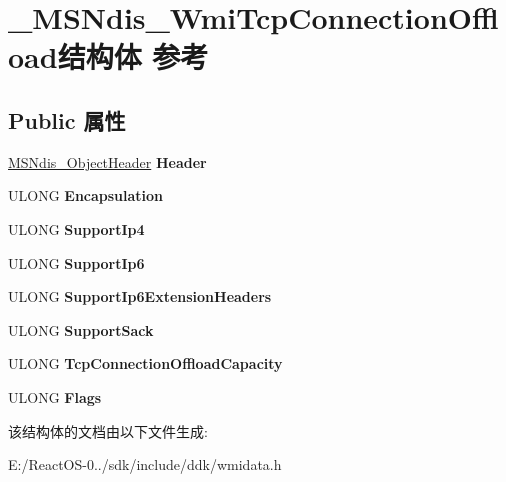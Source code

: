 \hypertarget{struct___m_s_ndis___wmi_tcp_connection_offload}{}\section{\+\_\+\+M\+S\+Ndis\+\_\+\+Wmi\+Tcp\+Connection\+Offload结构体 参考}
\label{struct___m_s_ndis___wmi_tcp_connection_offload}
\subsection*{Public 属性}
\begin{DoxyCompactItemize}
\item 
\mbox{\label{struct___m_s_ndis___wmi_tcp_connection_offload_a07eb0950675d631cdc23549e8d113b31}} 
\hyperlink{struct___m_s_ndis___object_header}{M\+S\+Ndis\+\_\+\+Object\+Header} {\bfseries Header}
\item 
\mbox{\label{struct___m_s_ndis___wmi_tcp_connection_offload_ad7d6854704d4605de5c6c78c5d14a54f}} 
U\+L\+O\+NG {\bfseries Encapsulation}
\item 
\mbox{\label{struct___m_s_ndis___wmi_tcp_connection_offload_a123208b78695282778ac4f13ad721b1f}} 
U\+L\+O\+NG {\bfseries Support\+Ip4}
\item 
\mbox{\label{struct___m_s_ndis___wmi_tcp_connection_offload_a4c616cf774ba3909574f031a3c7b6c88}} 
U\+L\+O\+NG {\bfseries Support\+Ip6}
\item 
\mbox{\label{struct___m_s_ndis___wmi_tcp_connection_offload_ad65bef0feb27fc9d072914035729a47c}} 
U\+L\+O\+NG {\bfseries Support\+Ip6\+Extension\+Headers}
\item 
\mbox{\label{struct___m_s_ndis___wmi_tcp_connection_offload_ad76bbada78594a25093218680a0816be}} 
U\+L\+O\+NG {\bfseries Support\+Sack}
\item 
\mbox{\label{struct___m_s_ndis___wmi_tcp_connection_offload_a4aa7662a70af60c96559a56563f5417f}} 
U\+L\+O\+NG {\bfseries Tcp\+Connection\+Offload\+Capacity}
\item 
\mbox{\label{struct___m_s_ndis___wmi_tcp_connection_offload_a7e14f432372ccd6b6c022ab3319c35ae}} 
U\+L\+O\+NG {\bfseries Flags}
\end{DoxyCompactItemize}


该结构体的文档由以下文件生成\+:\begin{DoxyCompactItemize}
\item 
E\+:/\+React\+O\+S-\/0../sdk/include/ddk/wmidata.\+h\end{DoxyCompactItemize}
